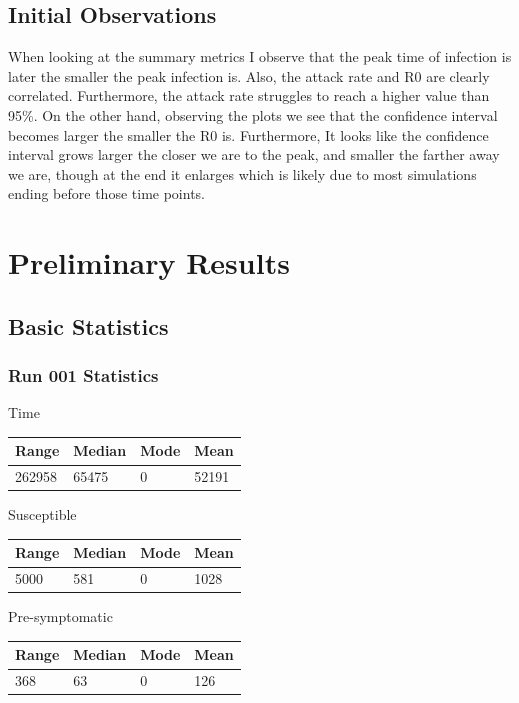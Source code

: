 \documentclass{article}
\begin{document}
\subsection{Initial Observations}
When looking at the summary metrics I observe that the peak time of infection is later the smaller the peak infection is. Also, the attack rate and R0 are clearly correlated. Furthermore, the attack rate struggles to reach a higher value than 95\%.
\newline
On the other hand, observing the plots we see that the confidence interval becomes larger the smaller the R0 is. Furthermore, It looks like the confidence interval grows larger the closer we are to the peak, and smaller the farther away we are, though at the end it enlarges which is likely due to most simulations ending before those time points.
\section{Preliminary Results}

\subsection{Basic Statistics}
\subsubsection{Run 001 Statistics}
Time
\newline
\begin{tabular}{| l | l | l | l |}
  \hline\hline
  Range & Median & Mode & Mean \\
  \hline
  262958 & 65475 & 0 & 52191 \\
  \hline
\end{tabular} 

Susceptible
\newline
\begin{tabular}{| l | l | l | l |}
  \hline\hline
  Range & Median & Mode & Mean \\
  \hline
  5000 & 581 & 0 & 1028 \\
  \hline
\end{tabular} 

Pre-symptomatic
\newline
\begin{tabular}{| l | l | l | l |}
  \hline\hline
  Range & Median & Mode & Mean \\
  \hline
  368 & 63 & 0 & 126 \\
  \hline
\end{tabular} 
\end{document}
